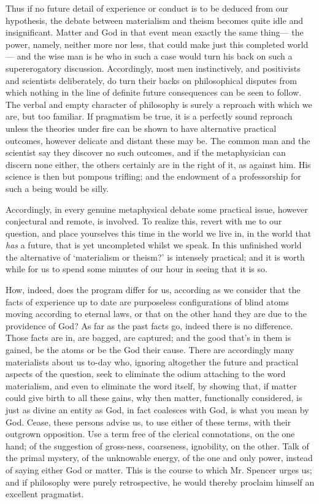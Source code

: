\documentclass[]{article}
\begin{document}
Thus if no future detail of experience or conduct is to be deduced from our hypothesis, the debate between materialism and theism becomes quite idle and insignificant. Matter and God in that event mean exactly the same thing--- the power, namely, neither more nor less, that could make just this completed world--- and the wise man is he who in such a case would turn his back on such a supererogatory discussion. Accordingly, most men instinctively, and positivists and scientists deliberately, do turn their backs on philosophical disputes from which nothing in the line of definite future consequences can be seen to follow. The verbal and empty character of philosophy is surely a reproach with which we are, but too familiar. If pragmatism be true, it is a perfectly sound reproach unless the theories under fire can be shown to have alternative practical outcomes, however delicate and distant these may be. The common man and the scientist say they discover no such outcomes, and if the metaphysician can discern none either, the others certainly are in the right of it, as against him. His science is then but pompous trifling; and the endowment of a professorship for such a being would be silly.

Accordingly, in every genuine metaphysical debate some practical issue, however conjectural and remote, is involved. To realize this, revert with me to our question, and place yourselves this time in the world we live in, in the world that \emph{has} a future, that is yet uncompleted whilst we speak. In this unfinished world the alternative of `materialism or theism?' is intensely practical; and it is worth while for us to spend some minutes of our hour in seeing that it is so.

How, indeed, does the program differ for us, according as we consider that the facts of experience up to date are purposeless configurations of blind atoms moving according to eternal laws, or that on the other hand they are due to the providence of God? As far as the past facts go, indeed there is no difference. Those facts are in, are bagged, are captured; and the good that's in them is gained, be the atoms or be the God their cause. There are accordingly many materialists about us to-day who, ignoring altogether the future and practical aspects of the question, seek to eliminate the odium attaching to the word materialism, and even to eliminate the word itself, by showing that, if matter could give birth to all these gains, why then matter, functionally considered, is just as divine an entity as God, in fact coalesces with God, is what you mean by God. Cease, these persons advise us, to use either of these terms, with their outgrown opposition. Use a term free of the clerical connotations, on the one hand; of the suggestion of gross-ness, coarseness, ignobility, on the other. Talk of the primal mystery, of the unknowable energy, of the one and only power, instead of saying either God or matter. This is the course to which Mr. Spencer urges us; and if philosophy were purely retrospective, he would thereby proclaim himself an excellent pragmatist.
\end{document}
